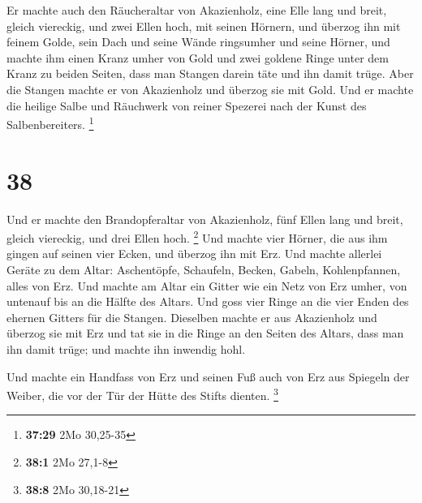  Er machte auch den Räucheraltar von Akazienholz, eine
Elle lang und breit, gleich viereckig, und zwei Ellen hoch, mit seinen
Hörnern,  und überzog ihn mit feinem Golde, sein Dach und
seine Wände ringsumher und seine Hörner, und machte ihm einen Kranz
umher von Gold  und zwei goldene Ringe unter dem Kranz zu
beiden Seiten, dass man Stangen darein täte und ihn damit trüge.
 Aber die Stangen machte er von Akazienholz und überzog
sie mit Gold.  Und er machte die heilige Salbe und
Räuchwerk von reiner Spezerei nach der Kunst des Salbenbereiters.
\footnote{\textbf{37:29} 2Mo 30,25-35}

\hypertarget{section-9}{%
\section{38}\label{section-9}}

 Und er machte den Brandopferaltar von Akazienholz, fünf
Ellen lang und breit, gleich viereckig, und drei Ellen hoch. \footnote{\textbf{38:1}
  2Mo 27,1-8}  Und machte vier Hörner, die aus ihm gingen
auf seinen vier Ecken, und überzog ihn mit Erz.  Und
machte allerlei Geräte zu dem Altar: Aschentöpfe, Schaufeln, Becken,
Gabeln, Kohlenpfannen, alles von Erz.  Und machte am Altar
ein Gitter wie ein Netz von Erz umher, von untenauf bis an die Hälfte
des Altars.  Und goss vier Ringe an die vier Enden des
ehernen Gitters für die Stangen.  Dieselben machte er aus
Akazienholz und überzog sie mit Erz  und tat sie in die
Ringe an den Seiten des Altars, dass man ihn damit trüge; und machte ihn
inwendig hohl.

 Und machte ein Handfass von Erz und seinen Fuß auch von
Erz aus Spiegeln der Weiber, die vor der Tür der Hütte des Stifts
dienten. \footnote{\textbf{38:8} 2Mo 30,18-21}

